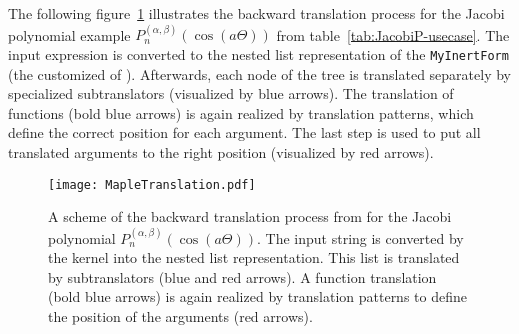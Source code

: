 The following figure~\ref{fig:backward-trans} illustrates the backward translation process for the Jacobi polynomial example $P_n^{(\alpha , \beta)}(\cos(a\Theta))$ from table~\ref{tab:JacobiP-usecase}. The input expression is converted to the nested list representation of the \texttt{MyInertForm} (the customized \inertF{} of \Maple). Afterwards, each node of the tree is translated separately by specialized subtranslators (visualized by blue arrows). The translation of functions (bold blue arrows) is again realized by translation patterns, which define the correct position for each argument. The last step is used to put all translated arguments to the right position (visualized by red arrows).

\begin{figure}[!htp]
	\centering
	\texttt{[image: MapleTranslation.pdf]}
	\caption{A scheme of the backward translation process from \Maple{} for the Jacobi polynomial $P_n^{(\alpha , \beta)}(\cos(a\Theta))$. The input string is converted by the \Maple{} kernel into the nested list representation. This list is translated by subtranslators (blue and red arrows). A function translation (bold blue arrows) is again realized by translation patterns to define the position of the arguments (red arrows).}
	\label{fig:backward-trans}
\end{figure}

\cleardoublepage